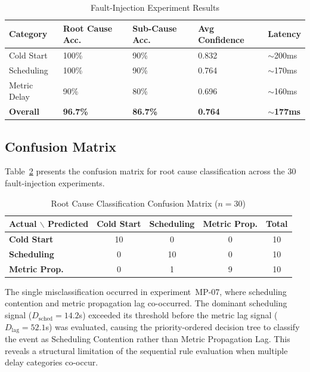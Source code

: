 \begin{table}[H]
\centering
\begin{tabularx}{\textwidth}{|l|X|X|X|X|}
\hline
\textbf{Category} & \textbf{Root Cause Acc.} & \textbf{Sub-Cause Acc.} & \textbf{Avg Confidence} & \textbf{Latency} \\ \hline
Cold Start & 100\% & 90\% & 0.832 & $\sim$200ms \\ \hline
Scheduling & 100\% & 90\% & 0.764 & $\sim$170ms \\ \hline
Metric Delay & 90\% & 80\% & 0.696 & $\sim$160ms \\ \hline
\textbf{Overall} & \textbf{96.7\%} & \textbf{86.7\%} & \textbf{0.764} & \textbf{$\sim$177ms} \\ \hline
\end{tabularx}
\caption{Fault-Injection Experiment Results}
\label{tab:results_summary}
\end{table}

\subsection{Confusion Matrix}
Table~\ref{tab:confusion_matrix} presents the confusion matrix for root cause classification across the 30 fault-injection experiments.

\begin{table}[H]
\centering
\begin{tabularx}{\textwidth}{|X|c|c|c|c|}
\hline
\textbf{Actual $\backslash$ Predicted} & \textbf{Cold Start} & \textbf{Scheduling} & \textbf{Metric Prop.} & \textbf{Total} \\ \hline
\textbf{Cold Start} & 10 & 0 & 0 & 10 \\ \hline
\textbf{Scheduling} & 0 & 10 & 0 & 10 \\ \hline
\textbf{Metric Prop.} & 0 & 1 & 9 & 10 \\ \hline
\end{tabularx}
\caption{Root Cause Classification Confusion Matrix ($n=30$)}
\label{tab:confusion_matrix}
\end{table}

The single misclassification occurred in experiment~MP-07, where scheduling contention and metric propagation lag co-occurred. The dominant scheduling signal ($D_{\text{sched}} = 14.2$s) exceeded its threshold before the metric lag signal ($D_{\text{lag}} = 52.1$s) was evaluated, causing the priority-ordered decision tree to classify the event as Scheduling Contention rather than Metric Propagation Lag. This reveals a structural limitation of the sequential rule evaluation when multiple delay categories co-occur.

